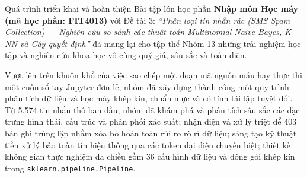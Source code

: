 
Quá trình triển khai và hoàn thiện Bài tập lớn học phần \textbf{Nhập môn Học máy (mã học phần: FIT4013)} với Đề tài 3: \textit{“Phân loại tin nhắn rác (SMS Spam Collection) --- Nghiên cứu so sánh các thuật toán Multinomial Naive Bayes, K-NN và Cây quyết định”} đã mang lại cho tập thể Nhóm 13 những trải nghiệm học tập và nghiên cứu khoa học vô cùng quý giá, sâu sắc và toàn diện.

Vượt lên trên khuôn khổ của việc sao chép một đoạn mã nguồn mẫu hay thực thi một cuốn sổ tay Jupyter đơn lẻ, nhóm đã xây dựng thành công một quy trình phân tích dữ liệu và học máy khép kín, chuẩn mực và có tính tái lập tuyệt đối. Từ 5.574 tin nhắn thô ban đầu, nhóm đã khám phá và phân tích sâu sắc các đặc trưng hình thái, cấu trúc và phân phối xác suất; nhận diện và xử lý triệt để 403 bản ghi trùng lặp nhằm xóa bỏ hoàn toàn rủi ro rò rỉ dữ liệu; sáng tạo kỹ thuật tiền xử lý bảo toàn tín hiệu thông qua các token đại diện chuyên biệt; thiết kế không gian thực nghiệm đa chiều gồm 36 cấu hình dữ liệu và đóng gói khép kín trong \texttt{sklearn.pipeline.Pipeline}.

